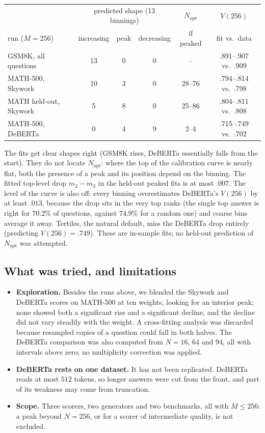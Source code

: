 \documentclass[11pt]{article}
\theoremstyle{definition}
\theoremstyle{remark}
\begin{document}
\begin{center}
\small
\begin{tabular}{lccccc}
\toprule
& \multicolumn{3}{c}{predicted shape (13 binnings)} & $N_{\mathrm{opt}}$ & $V(256)$ \\
run ($M=256$) & increasing & peak & decreasing & if peaked & fit vs.\ data \\
\midrule
GSM8K, all questions   & 13 & 0 & 0 & --      & .891--.907 vs.\ .909 \\
MATH-500, Skywork      & 10 & 3 & 0 & 28--76  & .794--.814 vs.\ .798 \\
MATH held-out, Skywork & 5  & 8 & 0 & 25--86  & .804--.811 vs.\ .808 \\
MATH-500, DeBERTa      & 0  & 4 & 9 & 2--4    & .715--.749 vs.\ .702 \\
\bottomrule
\end{tabular}
\end{center}

\noindent The fits get clear shapes right (GSM8K rises, DeBERTa essentially falls from the start). They do not
locate $N_{\mathrm{opt}}$: where the top of the calibration curve is nearly flat, both the presence of a peak and
its position depend on the binning. The fitted top-level drop $m_2-m_3$ in the held-out peaked fits is at most
$.007$. The level of the curve is also off: every binning overestimates DeBERTa's $V(256)$ by at least $.013$,
because the drop sits in the very top ranks (the single top answer is right for $70.2\%$ of questions,
against $74.9\%$ for a random one) and coarse bins average it away. Tertiles, the natural default, miss the
DeBERTa drop entirely (predicting $V(256)=.749$). These are in-sample fits; no held-out prediction of $N_{\mathrm{opt}}$ was attempted.

\subsection{What was tried, and limitations}

\begin{itemize}[leftmargin=*]
\item \textbf{Exploration.} Besides the runs above, we blended the Skywork and DeBERTa scores on
MATH-500 at ten weights, looking for an interior peak; none showed both a significant rise and a significant
decline, and the decline did not vary steadily with the weight. A cross-fitting analysis was discarded because resampled copies of a question could fall in both halves. The DeBERTa comparison was also computed from $N=16$, $64$ and $94$, all with intervals
above zero; no multiplicity correction was applied.
\item \textbf{DeBERTa rests on one dataset.} It has not been replicated. DeBERTa reads at most $512$ tokens, so longer answers were cut from the front,
and part of its weakness may come from truncation.
\item \textbf{Scope.} Three scorers, two generators and two benchmarks, all with $M\le256$: a peak beyond
$N=256$, or for a scorer of intermediate quality, is not excluded.
\end{itemize}
\end{document}
